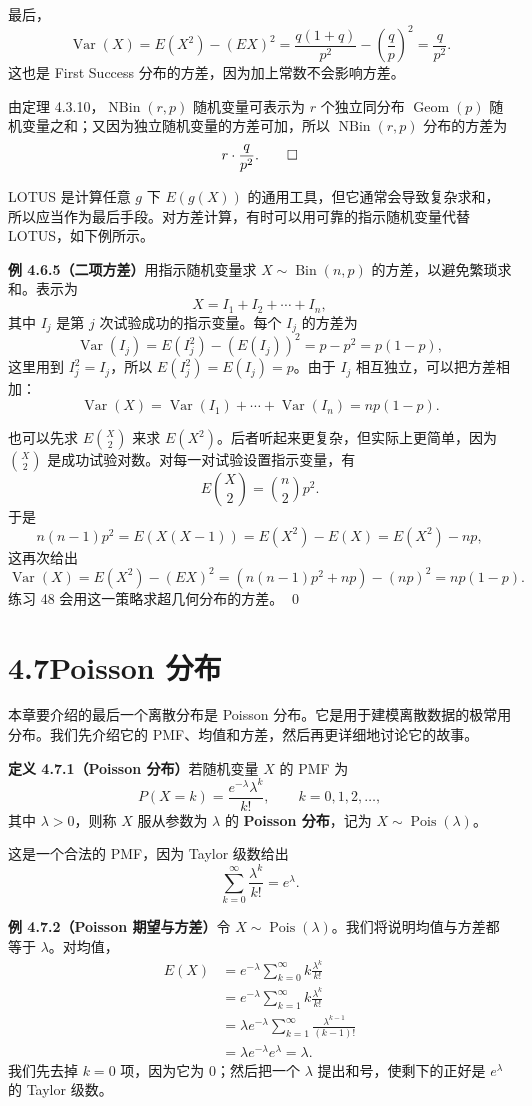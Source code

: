 \documentclass[UTF8,12pt,a4paper,fontset=fandol]{ctexart}
\begin{document}
最后，
\[
  \operatorname{Var}(X)
  =E(X^2)-(EX)^2
  =\frac{q(1+q)}{p^2}-\left(\frac{q}{p}\right)^2
  =\frac{q}{p^2}.
\]
这也是 First Success 分布的方差，因为加上常数不会影响方差。

由定理 4.3.10，$\operatorname{NBin}(r,p)$ 随机变量可表示为 $r$ 个独立同分布 $\operatorname{Geom}(p)$ 随机变量之和；又因为独立随机变量的方差可加，所以 $\operatorname{NBin}(r,p)$ 分布的方差为
\[
  r\cdot\frac{q}{p^2}. \qed
\]

LOTUS 是计算任意 $g$ 下 $E(g(X))$ 的通用工具，但它通常会导致复杂求和，所以应当作为最后手段。对方差计算，有时可以用可靠的指示随机变量代替 LOTUS，如下例所示。

\noindent\textbf{例 4.6.5（二项方差）}\quad 用指示随机变量求 $X\sim\operatorname{Bin}(n,p)$ 的方差，以避免繁琐求和。表示为
\[
  X=I_1+I_2+\cdots+I_n,
\]
其中 $I_j$ 是第 $j$ 次试验成功的指示变量。每个 $I_j$ 的方差为
\[
  \operatorname{Var}(I_j)=E(I_j^2)-(E(I_j))^2=p-p^2=p(1-p),
\]
这里用到 $I_j^2=I_j$，所以 $E(I_j^2)=E(I_j)=p$。由于 $I_j$ 相互独立，可以把方差相加：
\[
  \operatorname{Var}(X)
  =\operatorname{Var}(I_1)+\cdots+\operatorname{Var}(I_n)
  =np(1-p).
\]

也可以先求 $E\binom{X}{2}$ 来求 $E(X^2)$。后者听起来更复杂，但实际上更简单，因为 $\binom{X}{2}$ 是成功试验对数。对每一对试验设置指示变量，有
\[
  E\binom{X}{2}=\binom{n}{2}p^2.
\]
于是
\[
  n(n-1)p^2=E(X(X-1))=E(X^2)-E(X)=E(X^2)-np,
\]
这再次给出
\[
  \operatorname{Var}(X)=E(X^2)-(EX)^2
  =(n(n-1)p^2+np)-(np)^2=np(1-p).
\]
练习 48 会用这一策略求超几何分布的方差。 \qed

\section*{4.7\quad Poisson 分布}

本章要介绍的最后一个离散分布是 Poisson 分布。它是用于建模离散数据的极常用分布。我们先介绍它的 PMF、均值和方差，然后再更详细地讨论它的故事。

\noindent\textbf{定义 4.7.1（Poisson 分布）}\quad 若随机变量 $X$ 的 PMF 为
\[
  P(X=k)=\frac{e^{-\lambda}\lambda^k}{k!},\qquad k=0,1,2,\ldots,
\]
其中 $\lambda>0$，则称 $X$ 服从参数为 $\lambda$ 的 \textbf{Poisson 分布}，记为 $X\sim\operatorname{Pois}(\lambda)$。

这是一个合法的 PMF，因为 Taylor 级数给出
\[
  \sum_{k=0}^{\infty}\frac{\lambda^k}{k!}=e^\lambda.
\]

\noindent\textbf{例 4.7.2（Poisson 期望与方差）}\quad 令 $X\sim\operatorname{Pois}(\lambda)$。我们将说明均值与方差都等于 $\lambda$。对均值，
\[
\begin{aligned}
  E(X)
  &=e^{-\lambda}\sum_{k=0}^{\infty}k\frac{\lambda^k}{k!}\\
  &=e^{-\lambda}\sum_{k=1}^{\infty}k\frac{\lambda^k}{k!}\\
  &=\lambda e^{-\lambda}\sum_{k=1}^{\infty}\frac{\lambda^{k-1}}{(k-1)!}\\
  &=\lambda e^{-\lambda}e^\lambda=\lambda.
\end{aligned}
\]
我们先去掉 $k=0$ 项，因为它为 $0$；然后把一个 $\lambda$ 提出和号，使剩下的正好是 $e^\lambda$ 的 Taylor 级数。
\end{document}
